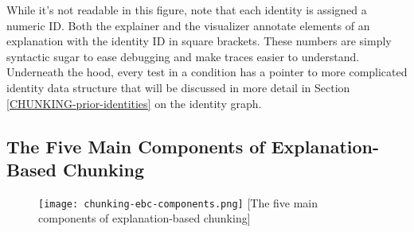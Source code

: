 While it's not readable in this figure, note that each identity is assigned a numeric ID.  Both the explainer and the visualizer annotate elements of an explanation with the identity ID in square brackets.  These numbers are simply syntactic sugar to ease debugging and make traces easier to understand.  Underneath the hood, every test in a condition has a pointer to more complicated identity data structure that will be discussed in more detail in Section \ref{CHUNKING-prior-identities} on the identity graph.


\subsection{The Five Main Components of Explanation-Based Chunking}

\vspace{12pt}
\begin{figure}
	\centering
	\texttt{[image: chunking-ebc-components.png]}
	[The five main components of explanation-based chunking]
	\label{fig:chunking-ebc-components}
\end{figure}

